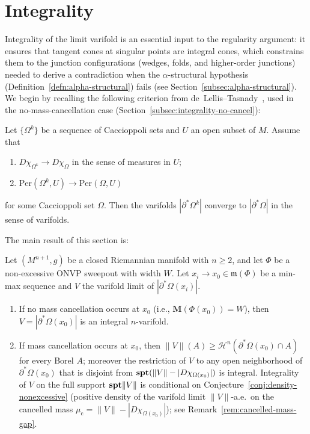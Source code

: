 
\section{Integrality}\label{sec:integrality}

Integrality of the limit varifold is an essential input to the regularity argument: it ensures that tangent cones at singular points are integral cones, which constrains them to the junction configurations (wedges, folds, and higher-order junctions) needed to derive a contradiction when the $\alpha$-structural hypothesis (Definition~\ref{defn:alpha-structural}) fails (see Section~\ref{subsec:alpha-structural}). We begin by recalling the following criterion from de~Lellis--Tasnady~\cite{DLT13}, used in the no-mass-cancellation case (Section~\ref{subsec:integrality-no-cancel}):

\begin{proposition}\label{prop:p2-DLT-integrality}
    Let $\{\Omega^k\}$ be a sequence of Caccioppoli sets and $U$ an open subset of $M$. Assume that
    \begin{enumerate}[label=\textup{(\roman*)}]
        \item $D\chi_{\Omega^k} \to D\chi_\Omega$ in the sense of measures in $U$;
        \item $\mathrm{Per}(\Omega^k, U) \to \mathrm{Per}(\Omega, U)$
    \end{enumerate}
    for some Caccioppoli set $\Omega$. Then the varifolds $|\partial^*\Omega^k|$ converge to $|\partial^*\Omega|$ in the sense of varifolds.
\end{proposition}

The main result of this section is:

\begin{theorem}\label{thm:integrality}
Let $(M^{n+1}, g)$ be a closed Riemannian manifold with $n \geq 2$, and let $\Phi$ be a non-excessive ONVP sweepout with width $W$. Let $x_i \to x_0 \in \mathfrak{m}(\Phi)$ be a min-max sequence and $V$ the varifold limit of $|\partial^*\Omega(x_i)|$.
\begin{enumerate}[label=\textup{(\alph*)}]
    \item If no mass cancellation occurs at $x_0$ (i.e., $\mathbf{M}(\Phi(x_0)) = W$), then $V = |\partial^*\Omega(x_0)|$ is an integral $n$-varifold.
    \item If mass cancellation occurs at $x_0$, then $\|V\|(A) \geq \mathcal{H}^n(\partial^*\Omega(x_0) \cap A)$ for every Borel $A$; moreover the restriction of $V$ to any open neighborhood of $\partial^*\Omega(x_0)$ that is disjoint from $\mathbf{spt}(\|V\| - |D\chi_{\Omega(x_0)}|)$ is integral. Integrality of $V$ on the full support $\mathbf{spt}\|V\|$ is conditional on Conjecture~\ref{conj:density-nonexcessive} (positive density of the varifold limit $\|V\|$-a.e.\ on the cancelled mass $\mu_{\mathrm{c}} = \|V\| - |D\chi_{\Omega(x_0)}|$); see Remark~\ref{rem:cancelled-mass-gap}.
\end{enumerate}
\end{theorem}

